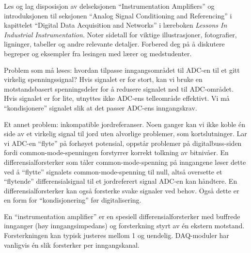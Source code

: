 

Les og lag disposisjon av delseksjonen ``Instrumentation Amplifiers'' og introduksjonen til seksjonen ``Analog Signal Conditioning and Referencing'' i kapittelet ``Digital Data Acquisition and Networks'' i læreboken {\it Lessons In Industrial Instrumentation}. Noter sidetall for viktige illustrasjoner, fotografier, ligninger, tabeller og andre relevante detaljer. Forbered deg på å diskutere begreper og eksempler fra lesingen med lærer og medstudenter.














Problem som må løses: hvordan tilpasse inngangsområdet til ADC-en til et gitt virkelig spenningssignal? Hvis signalet er for stort, kan vi bruke en motstandsbasert spenningsdeler for å redusere signalet ned til ADC-området. Hvis signalet er for lite, utnyttes ikke ADC-ens telleområde effektivt. Vi må ``kondisjonere'' signalet slik at det passer ADC-ens inngangskrav.

\vskip 10pt

Et annet problem: inkompatible jordreferanser. Noen ganger kan vi ikke koble én side av et virkelig signal til jord uten alvorlige problemer, som kortslutninger. Lar vi ADC-en ``flyte'' på forhøyet potensial, oppstår problemer på digitalbuss-siden fordi common-mode-spenningen forstyrrer korrekt tolkning av bitnivåer. En differensialforsterker som tåler common-mode-spenning på inngangene løser dette ved å ``flytte'' signalets common-mode-spenning til null, altså oversette et ``flytende'' differensialsignal til et jordreferert signal ADC-en kan håndtere. En differensialforsterker kan også forsterke svake signaler ved behov. Også dette er en form for ``kondisjonering'' før digitalisering.

\vskip 10pt

En ``instrumentation amplifier'' er en spesiell differensialforsterker med buffrede innganger (høy inngangsimpedans) og forsterkning styrt av én ekstern motstand. Forsterkningen kan typisk justeres mellom 1 og uendelig. DAQ-moduler har vanligvis én slik forsterker per inngangskanal.






